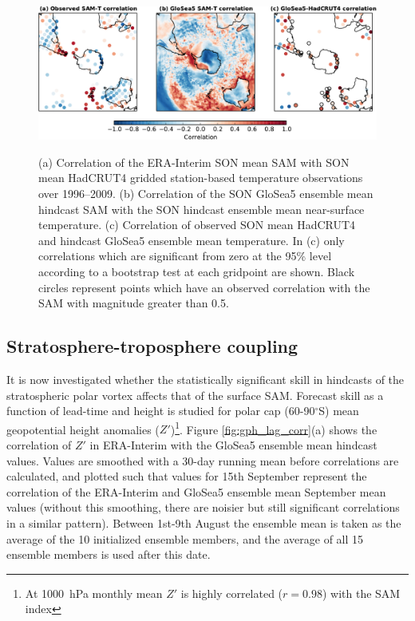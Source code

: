 \begin{figure}[t]
  \noindent\includegraphics[width=\textwidth,angle=0]{figures/chapter-seasonal/mslp_tsrf_maps_crop.pdf}\\
  \caption[Correlation of GloSea5 forecasts of sea-level pressure and
  temperature.]{(a) Correlation of the ERA-Interim SON mean SAM with SON mean
    HadCRUT4 gridded station-based temperature observations over 1996--2009. (b)
    Correlation of the SON GloSea5 ensemble mean hindcast SAM with the SON
    hindcast ensemble mean near-surface temperature. (c) Correlation of observed
    SON mean HadCRUT4 and hindcast GloSea5 ensemble mean temperature. In (c)
    only correlations which are significant from zero at the 95\% level
    according to a bootstrap test at each gridpoint are shown. Black circles
    represent points which have an observed correlation with the SAM with
    magnitude greater than 0.5.}\label{fig:mslp_tsrf_map}
\end{figure}


\subsection{Stratosphere-troposphere coupling}

It is now investigated whether the statistically significant skill in hindcasts
of the stratospheric polar vortex affects that of the surface SAM. Forecast
skill as a function of lead-time and height is studied for polar cap
(60-90$^{\circ}$S) mean geopotential height anomalies ($Z'$)\footnote{At
  1000~hPa monthly mean $Z'$ is highly correlated ($r=0.98$) with the SAM
  index}. Figure \ref{fig:gph_lag_corr}(a) shows the correlation of $Z'$ in
ERA-Interim with the GloSea5 ensemble mean hindcast values. Values are smoothed
with a 30-day running mean before correlations are calculated, and plotted such
that values for 15th September represent the correlation of the ERA-Interim and
GloSea5 ensemble mean September mean values (without this smoothing, there are
noisier but still significant correlations in a similar pattern). Between
1st-9th August the ensemble mean is taken as the average of the 10 initialized
ensemble members, and the average of all 15 ensemble members is used after this
date.

